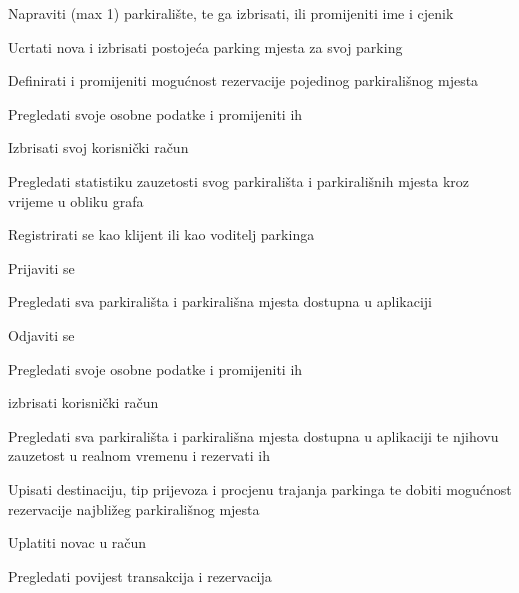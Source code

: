 			
			\begin{packed_enum}
				\item  {}
				
				\begin{packed_enum}
					
					\item Napraviti (max 1) parkiralište, te ga izbrisati, ili promijeniti ime i cjenik
					\item Ucrtati nova i izbrisati postojeća parking mjesta za svoj parking
					\item Definirati i promijeniti mogućnost rezervacije pojedinog parkirališnog mjesta
					\item Pregledati svoje osobne podatke i promijeniti ih
					\item Izbrisati svoj korisnički račun
					\item Pregledati statistiku zauzetosti svog parkirališta i parkirališnih mjesta kroz vrijeme u obliku grafa
					
				\end{packed_enum}
			
				\item  {}
				
				\begin{packed_enum}
					
					\item Registrirati se kao klijent ili kao voditelj parkinga
					\item Prijaviti se
					\item Pregledati sva parkirališta i parkirališna mjesta dostupna u aplikaciji
					
				\end{packed_enum}
			
				\item  {}
				
				\begin{packed_enum}
					
					\item Odjaviti se
					\item Pregledati svoje osobne podatke i promijeniti ih
					\item izbrisati korisnički račun
					\item Pregledati sva parkirališta i parkirališna mjesta dostupna u aplikaciji te njihovu zauzetost u realnom vremenu i rezervati ih
					\item Upisati destinaciju, tip prijevoza i procjenu trajanja parkinga te dobiti mogućnost rezervacije najbližeg parkirališnog mjesta
					\item Uplatiti novac u račun
					\item Pregledati povijest transakcija i rezervacija
					

\end{packed_enum}
\end{packed_enum}
